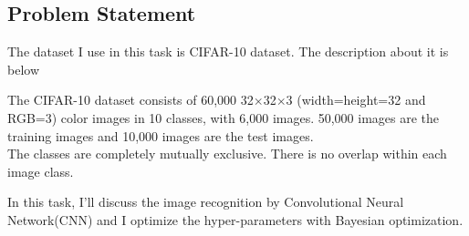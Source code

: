 \subsection{Problem Statement}


The dataset I use in this task is CIFAR-10 dataset. The description about it is below


The CIFAR-10 dataset consists of 60,000 32$\times$32$\times$3 (width=height=32 and RGB=3) color images in 10 classes, with 6,000 images. 50,000 images are the training images and 10,000 images are the test images.\\
The classes are completely mutually exclusive. There is no overlap within each image class.

In this task, I'll discuss the image recognition by Convolutional Neural Network(CNN) and I optimize the hyper-parameters with Bayesian optimization.


